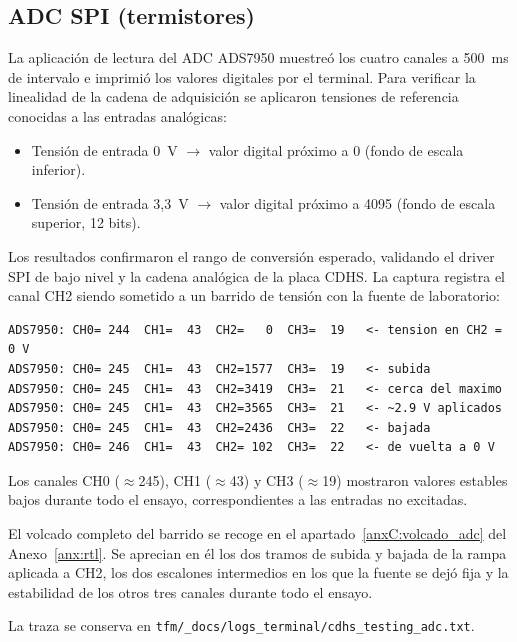 \subsection{ADC SPI (termistores)}

La aplicación de lectura del ADC ADS7950 muestreó los cuatro canales a 500~ms de intervalo
e imprimió los valores digitales por el terminal. Para verificar la linealidad de la cadena de
adquisición se aplicaron tensiones de referencia conocidas a las entradas analógicas:

\begin{itemize}
    \item Tensión de entrada 0~V $\rightarrow$ valor digital próximo a 0 (fondo de escala inferior).
    \item Tensión de entrada 3,3~V $\rightarrow$ valor digital próximo a 4095 (fondo de escala
    superior, 12 bits).
\end{itemize}

Los resultados confirmaron el rango de conversión esperado, validando el driver SPI de bajo
nivel y la cadena analógica de la placa CDHS. La captura registra el canal CH2 siendo
sometido a un barrido de tensión con la fuente de laboratorio:

\begin{lstlisting}[style=terminal, caption={Lectura del ADC ADS7950 durante barrido de tensión en CH2}]
ADS7950: CH0= 244  CH1=  43  CH2=   0  CH3=  19   <- tension en CH2 = 0 V
ADS7950: CH0= 245  CH1=  43  CH2=1577  CH3=  19   <- subida
ADS7950: CH0= 245  CH1=  43  CH2=3419  CH3=  21   <- cerca del maximo
ADS7950: CH0= 245  CH1=  43  CH2=3565  CH3=  21   <- ~2.9 V aplicados
ADS7950: CH0= 245  CH1=  43  CH2=2436  CH3=  22   <- bajada
ADS7950: CH0= 246  CH1=  43  CH2= 102  CH3=  22   <- de vuelta a 0 V
\end{lstlisting}

Los canales CH0 ($\approx$245), CH1 ($\approx$43) y CH3 ($\approx$19) mostraron valores
estables bajos durante todo el ensayo, correspondientes a las entradas no excitadas.

El volcado completo del barrido se recoge en el
apartado~\ref{anxC:volcado_adc} del Anexo~\ref{anx:rtl}. Se aprecian en él los dos tramos de subida y bajada de la rampa aplicada a CH2, los
dos escalones intermedios en los que la fuente se dejó fija y la estabilidad de los otros tres
canales durante todo el ensayo.

La traza se conserva en
\texttt{tfm/\_docs/\allowbreak logs\_terminal/\allowbreak cdhs\_testing\_adc.txt}.

